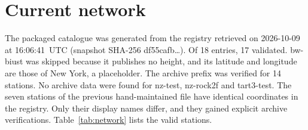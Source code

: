\documentclass[11pt,a4paper]{article}
\newcommand{\code}[1]{{\ttfamily\def\_{\textunderscore\allowbreak}#1}}
\begin{document}
\section{Current network}

The packaged catalogue was generated from the registry retrieved on
2026-10-09 at 16:06:41~UTC (snapshot SHA-256 \code{df55cafb\dots}). Of 18
entries, 17 validated. \code{bw-biust} was skipped because it publishes no
height, and its latitude and longitude are those of New York, a placeholder.
The archive prefix was verified for 14 stations. No archive data were found
for \code{nz-test}, \code{nz-rock2f} and \code{tart3-test}. The seven
stations of the previous hand-maintained file have identical coordinates in
the registry. Only their display names differ, and they gained explicit
archive verifications. Table~\ref{tab:network} lists the valid stations.
\end{document}
